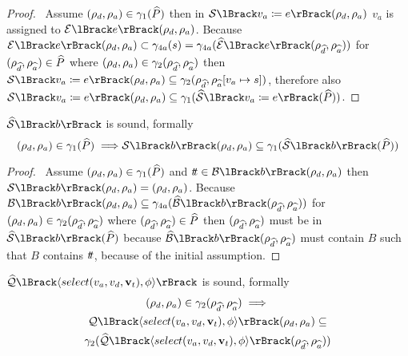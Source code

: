 \begin{proof}
    \pf\
    Assume $(\rho_{d}, \rho_{a}) \in \gamma_1(\widehat{P})$ then in $\sem{v_a \coloneqq e}(\env{d}, \env{a})$ $v_a$ is assigned to $\expsem{e}(\env{d}, \env{a})$.
    Because $\expsem{e}(\env{d}, \env{a}) \subset \concrete_{4a}(s) = \concrete_{4a}(\absexpsem{e}(\env{\ab{d}}, \env{\ab{a}}))$ for $(\rho_{\widehat{d}}, \rho_{\widehat{a}}) \in \widehat{P}$ where $(\rho_{d}, \rho_{a}) \in \gamma_2(\rho_{\widehat{d}}, \rho_{\widehat{a}})$ then $\sem{v_a \coloneqq e}(\env{d}, \env{a}) \subseteq \concrete_2(\env{\ab{d}}, \env{\ab{a}}[v_a \mapsto s])$, therefore also $\sem{v_a \coloneqq e}(\env{d}, \env{a}) \subseteq \concrete_1(\abssem{v_a \coloneqq e}(\ab{P}))$.
\end{proof}


\begin{conjecture}
    \label{thm:sound-boolsem}
    $\abssem{b}$ is sound, formally
    \begin{equation*}
    (\rho_d, \rho_a)
        \in \concrete_1(\ab{P}) \implies \\
        \sem{b}(\rho_d, \rho_a) \subseteq \concrete_1(\abssem{b}(\ab{P}))
    \end{equation*}
\end{conjecture}


\begin{proof}
    \pf\
    Assume $(\rho_{d}, \rho_{a}) \in \gamma_1(\widehat{P})$ and $\true \in \boolsem{b}(\env{d}, \env{a})$ then $\sem{b}(\env{d}, \env{a}) = (\env{d}, \env{a})$.
    Because $\boolsem{b}(\env{d}, \env{a}) \subseteq \concrete_{4a}(\absboolsem{b}(\env{\ab{d}}, \env{\ab{a}}))$ for $(\rho_{d}, \rho_{a}) \in \gamma_2(\rho_{\widehat{d}}, \rho_{\widehat{a}})$ where $(\rho_{\widehat{d}}, \rho_{\widehat{a}}) \in \widehat{P}$ then $(\rho_{\widehat{d}}, \rho_{\widehat{a}})$ must be in $\abssem{b}(\ab{P})$ because $\absboolsem{b}(\env{\ab{d}}, \env{\ab{a}})$ must contain $B$ such that $B$ contains $t\!t$, because of the initial assumption.
\end{proof}


\begin{conjecture}
    \label{thm:sound-select}
    $\abssqlsem{\langle select(v_a, v_d, \mathbf{v}_t), \phi \rangle}$ is sound, formally
    \begin{multline*}
    (\rho_d, \rho_a)
        \in \concrete_2(\rho_{\ab{d}}, \rho_{\ab{a}}) \implies \\
        \sqlsem{\langle select(v_a, v_d, \mathbf{v}_t), \phi \rangle}(\rho_d, \rho_a) \subseteq \\
        \concrete_2(\abssqlsem{\langle select(v_a, v_d, \mathbf{v}_t), \phi \rangle}(\rho_{\ab{d}}, \rho_{\ab{a}}))
    \end{multline*}
\end{conjecture}


